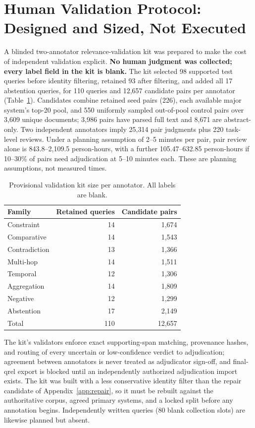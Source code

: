 \section{Human Validation Protocol: Designed and Sized, Not Executed}
\label{app:human}
A blinded two-annotator relevance-validation kit was prepared to make the cost of independent validation explicit. \textbf{No human judgment was collected; every label field in the kit is blank.} The kit selected 98 supported test queries before identity filtering, retained 93 after filtering, and added all 17 abstention queries, for 110 queries and 12,657 candidate pairs per annotator (Table~\ref{tab:kit}). Candidates combine retained seed pairs (226), each available major system's top-20 pool, and 550 uniformly sampled out-of-pool control pairs over 3,609 unique documents; 3,986 pairs have parsed full text and 8,671 are abstract-only. Two independent annotators imply 25,314 pair judgments plus 220 task-level reviews. Under a planning assumption of 2--5 minutes per pair, pair review alone is 843.8--2,109.5 person-hours, with a further 105.47--632.85 person-hours if 10--30\% of pairs need adjudication at 5--10 minutes each. These are planning assumptions, not measured times.

\begin{table}[h]
\centering
\small
\caption{Provisional validation kit size per annotator. All labels are blank.}
\label{tab:kit}
\begin{tabular}{@{}lrr@{}}
\toprule
Family & Retained queries & Candidate pairs \\
\midrule
Constraint & 14 & 1,674 \\
Comparative & 14 & 1,543 \\
Contradiction & 13 & 1,366 \\
Multi-hop & 14 & 1,511 \\
Temporal & 12 & 1,306 \\
Aggregation & 14 & 1,809 \\
Negative & 12 & 1,299 \\
Abstention & 17 & 2,149 \\
\midrule
Total & 110 & 12,657 \\
\bottomrule
\end{tabular}
\end{table}

The kit's validators enforce exact supporting-span matching, provenance hashes, and routing of every uncertain or low-confidence verdict to adjudication; agreement between annotators is never treated as adjudicator sign-off, and final-qrel export is blocked until an independently authorized adjudication import exists. The kit was built with a less conservative identity filter than the repair candidate of Appendix~\ref{app:repair}, so it must be rebuilt against the authoritative corpus, agreed primary systems, and a locked split before any annotation begins. Independently written queries (80 blank collection slots) are likewise planned but absent.

